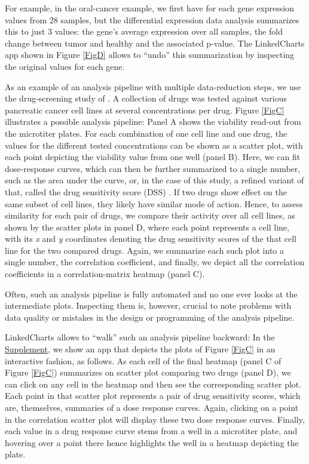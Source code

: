 \documentclass[twocolumn,10pt]{article}
\newcommand{\Supplement}{\href{https://anders-biostat.github.io/lc-paper/}{Supplement}}
\begin{document}
For example, in the oral-cancer example, we first have for each gene expression values from 28 samples, but the differential expression data analysis summarizes this to just 3 values: the gene's average expression over all samples, the fold change between tumor and healthy and the associated p-value. The LinkedCharts app shown in Figure \ref{FigD} allows to ``undo'' this summarization by inspecting the original values for each gene.

As an example of an analysis pipeline with multiple data-reduction steps, we use the drug-screening study of \citet{he_2018}. A collection of drugs was tested against various pancreatic cancer cell lines at several concentrations per drug. Figure \ref{FigC} illustrates a possible analysis pipeline: Panel A shows the viability read-out from the microtiter plates. For each combination of one cell line and one drug, the values for the different tested concentrations can be shown as a scatter plot, with each point depicting the viability value from one well (panel B). Here, we can fit dose-response curves, which can then be further summarized to a single number, such as the area under the curve, or, in the case of this study, a refined variant of that, called the drug sensitivity score (DSS) \citep{yadav_2014}. If two drugs show effect on the same subset of cell lines, they likely have similar mode of action. Hence, to assess similarity for each pair of drugs, we compare their activity over all cell lines, as shown by the scatter plots in panel D, where each point represents a cell line, with its \emph{x} and \emph{y} coordinates denoting the drug sensitivity scores of the that cell line for the two compared drugs. Again, we summarize each such plot into a single number, the correlation coefficient, and finally, we depict all the correlation coefficients in a correlation-matrix heatmap (panel C).

Often, such an analysis pipeline is fully automated and no one ever looks at the intermediate plots. Inspecting them is, however, crucial to note problems with data quality or mistakes in the design or programming of the analysis pipeline.

LinkedCharts allows to ``walk'' such an analysis pipeline backward: In the \Supplement, we show an app that depicts the plots of Figure \ref{FigC} in an interactive fashion, as follows. As each cell of the final heatmap (panel C of Figure \ref{FigC}) summarizes on scatter plot comparing two drugs (panel D), we can click on any cell in the heatmap and then see the corresponding scatter plot. Each point in that scatter plot represents a pair of drug sensitivity scores, which are, themselves, summaries of a dose response curves. Again, clicking on a point in the correlation scatter plot will display these two dose response curves. Finally, each value in a drug response curve stems from a well in a microtiter plate, and hovering over a point there hence highlights the well in a heatmap depicting the plate.
\end{document}
